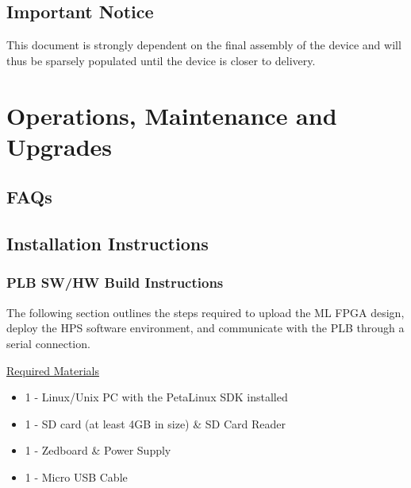 \documentclass[10pt,letterpaper]{article}
\begin{document}
\subsection{Important Notice}
This document is strongly dependent on the final assembly of the device and will thus be sparsely populated until the device is closer to delivery.

\section{Operations, Maintenance and Upgrades}
\subsection{FAQs}
\subsection{Installation Instructions}
\subsubsection{PLB SW/HW Build Instructions}
The following section outlines the steps required to upload the ML FPGA design, deploy the HPS software environment, and communicate with the PLB through a serial connection.

\underline{Required Materials}
\begin{itemize}
\item 1 - Linux/Unix PC with the PetaLinux SDK\cite{petalinux} installed
\item 1 - SD card (at least 4GB in size) \& SD Card Reader
\item 1 - Zedboard \& Power Supply
\item 1 - Micro USB Cable
\end{itemize}
\end{document}
